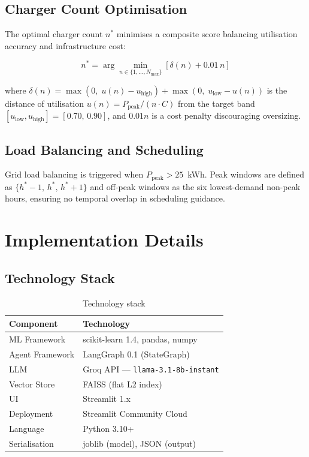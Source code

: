 \documentclass[12pt,a4paper]{article}
\begin{document}
\subsection{Charger Count Optimisation}

The optimal charger count $n^*$ minimises a composite score balancing utilisation
accuracy and infrastructure cost:

\[
  n^* = \arg\min_{n \in \{1,\ldots,N_{\max}\}}
        \left[\delta(n) + 0.01\,n\right]
\]

where $\delta(n) = \max(0,\; u(n) - u_{\text{high}}) + \max(0,\; u_{\text{low}} - u(n))$
is the distance of utilisation $u(n) = P_{\text{peak}} / (n \cdot C)$ from the
target band $[u_{\text{low}}, u_{\text{high}}] = [0.70,\, 0.90]$, and $0.01n$ is
a cost penalty discouraging oversizing.

\subsection{Load Balancing and Scheduling}

Grid load balancing is triggered when $P_{\text{peak}} > 25$~kWh. Peak windows
are defined as $\{h^* - 1,\, h^*,\, h^* + 1\}$ and off-peak windows as the six
lowest-demand non-peak hours, ensuring no temporal overlap in scheduling guidance.

\section{Implementation Details}
\label{sec:implementation}

\subsection{Technology Stack}

\begin{table}[H]
\centering
\caption{Technology stack}
\begin{tabular}{ll}
  \toprule
  \textbf{Component} & \textbf{Technology} \\
  \midrule
  ML Framework    & scikit-learn 1.4, pandas, numpy \\
  Agent Framework & LangGraph 0.1 (StateGraph) \\
  LLM             & Groq API — \texttt{llama-3.1-8b-instant} \\
  Vector Store    & FAISS (flat L2 index) \\
  UI              & Streamlit 1.x \\
  Deployment      & Streamlit Community Cloud \\
  Language        & Python 3.10+ \\
  Serialisation   & joblib (model), JSON (output) \\
  \bottomrule
\end{tabular}
\end{table}
\end{document}

